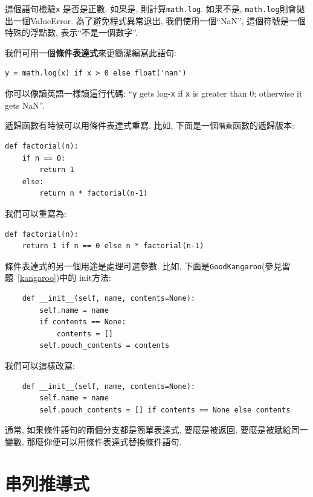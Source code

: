 \documentclass[10pt]{book}
\begin{document}
這個語句檢驗{\tt x} 是否是正數. 
如果是, 則計算{\tt math.log}. 
如果不是, {\tt math.log}則會拋出一個ValueError.
為了避免程式異常退出, 我們使用一個``NaN'', 這個符號是一個特殊的浮點數, 
表示``不是一個數字''. 

我們可用一個{\bf 條件表達式}來更簡潔編寫此語句:

\begin{verbatim}
y = math.log(x) if x > 0 else float('nan')
\end{verbatim}

你可以像讀英語一樣讀這行代碼: ``{\tt y} gets log-{\tt x}
if {\tt x} is greater than 0; otherwise it gets NaN''.

遞歸函數有時候可以用條件表達式重寫. 
比如, 下面是一個{\tt 階乘}函數的遞歸版本:

\begin{verbatim}
def factorial(n):
    if n == 0:
        return 1
    else:
        return n * factorial(n-1)
\end{verbatim}

我們可以重寫為:

\begin{verbatim}
def factorial(n):
    return 1 if n == 0 else n * factorial(n-1)
\end{verbatim}

條件表達式的另一個用途是處理可選參數. 
比如, 下面是{\tt GoodKangaroo}(參見習題~\ref{kangaroo})中的
init方法:

\begin{verbatim}
    def __init__(self, name, contents=None):
        self.name = name
        if contents == None:
            contents = []
        self.pouch_contents = contents
\end{verbatim}

我們可以這樣改寫:

\begin{verbatim}
    def __init__(self, name, contents=None):
        self.name = name
        self.pouch_contents = [] if contents == None else contents 
\end{verbatim}

通常, 如果條件語句的兩個分支都是簡單表達式, 要麼是被返回, 要麼是被賦給同一變數, 
那麼你便可以用條件表達式替換條件語句. 



\section{串列推導式}
\end{document}
